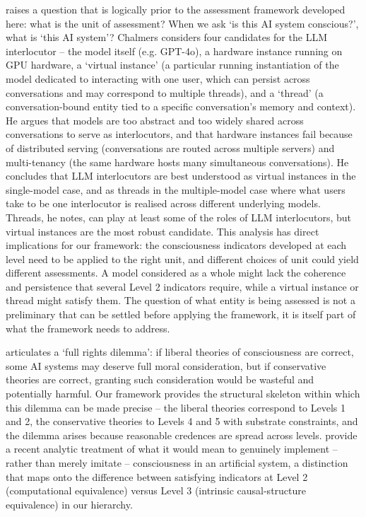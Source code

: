 \documentclass[11pt, a4paper, onecolumn, gdm]{google}
\begin{document}
\citet{chalmers2026} raises a question that is logically prior to the assessment framework developed here: what is the unit of assessment?
When we ask `is this AI system conscious?', what is `this AI system'?
Chalmers considers four candidates for the LLM interlocutor -- the model itself (e.g. GPT-4o), a hardware instance running on GPU hardware, a `virtual instance' (a particular running instantiation of the model dedicated to interacting with one user, which can persist across conversations and may correspond to multiple threads), and a `thread' (a conversation-bound entity tied to a specific conversation's memory and context).
He argues that models are too abstract and too widely shared across conversations to serve as interlocutors, and that hardware instances fail because of distributed serving (conversations are routed across multiple servers) and multi-tenancy (the same hardware hosts many simultaneous conversations).
He concludes that LLM interlocutors are best understood as virtual instances in the single-model case, and as threads in the multiple-model case where what users take to be one interlocutor is realised across different underlying models.
Threads, he notes, can play at least some of the roles of LLM interlocutors, but virtual instances are the most robust candidate.
This analysis has direct implications for our framework: the consciousness indicators developed at each level need to be applied to the right unit, and different choices of unit could yield different assessments.
A model considered as a whole might lack the coherence and persistence that several Level 2 indicators require, while a virtual instance or thread might satisfy them.
The question of what entity is being assessed is not a preliminary that can be settled before applying the framework, it is itself part of what the framework needs to address.

\citet{schwitzgebel2023} articulates a `full rights dilemma': if liberal theories of consciousness are correct, some AI systems may deserve full moral consideration, but if conservative theories are correct, granting such consideration would be wasteful and potentially harmful.
Our framework provides the structural skeleton within which this dilemma can be made precise -- the liberal theories correspond to Levels 1 and 2, the conservative theories to Levels 4 and 5 with substrate constraints, and the dilemma arises because reasonable credences are spread across levels.
\citet{dung2025} provide a recent analytic treatment of what it would mean to genuinely implement -- rather than merely imitate -- consciousness in an artificial system, a distinction that maps onto the difference between satisfying indicators at Level 2 (computational equivalence) versus Level 3 (intrinsic causal-structure equivalence) in our hierarchy.
\end{document}
